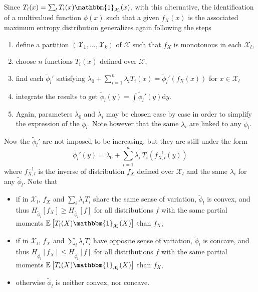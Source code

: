 \documentclass[english,onecolumn]{elsarticle}
\def\d{\mathrm{d}}
\def\X{\mathcal{X}}
\def\un{\mathbbm{1}}
\newcommand\Esp[1]{\mathbb{E}\left[ #1 \right]}
\begin{document}
Since  $T_i(x)  =  \sum_l  T_i(x)  \un_{\X_l}(x)$, with  this  alternative,  the
identification of a multivalued function $\phi(x)$ such that a given $f_X(x)$ is
the  associated maximum  entropy  distribution generalizes  again following  the
steps
%
\begin{enumerate}
\item  define  a partition  $(\X_1,\ldots,\X_k)$  of  $\X$  such that  $f_X$  is
  monotonous in each $\X_l$,
%
\item choose $n$ functions $T_i(x)$ defined over $\X$,
%
\item  find  each $\widetilde{\phi}_l'$  satisfying  $\displaystyle \lambda_0  +
  \sum_{i=1}^n \lambda_i T_i(x) = \widetilde{\phi}_l'(f_X(x))$ for $x \in \X_l$
%
\item integrate  the results to get $\displaystyle  \widetilde{\phi}_l(y) = \int
  \widetilde{\phi}_l'(y) \d y$.
% 
\item Again, parameters  $\lambda_0$ and $\lambda_i$ may be  chosen case by case
  in order to simplify the  expression of the $\widetilde{\phi}_l$. Note however
  that the same $\lambda_i$ are linked to any $\widetilde{\phi}_l$.
\end{enumerate}

Now the  $\widetilde{\phi}_l'$ are  not imposed to  be increasing, but  they are
still under the form
%
\begin{equation}
\widetilde{\phi}_l'(y) = \lambda_0 + \sum_{i=1}^n \lambda_i \, T_i \! \left(
f_{X,l}^{-1}(y) \right)
\label{eq:derivative-phil-nonconcave}
\end{equation}
%
where $f_{X,l}^{-1}$  is the inverse  of distribution $f_X$ defined  over $\X_l$
and the same $\lambda_i$ for any $\widetilde{\phi}_l$. Note that
%
\begin{itemize}
\item if  in $\X_l$, $f_X$  and $\sum_i \lambda_i  T_i$ share the same  sense of
  variation,       $\widetilde{\phi}_l$      is      convex,       and      thus
  $H_{\widetilde{\phi}_l}[f_X]    \ge    H_{\widetilde{\phi_l}}[f]$   for    all
  distributions $f$  with the same partial  moments $\Esp{T_i(X) \un_{\X_l}(X)}$
  than $f_X$,
%
\item if  in $\X_l$,  $f_X$ and  $\sum_i \lambda_i T_i$  have opposite  sense of
  variation,      $\widetilde{\phi}_l$       is      concave,      and      thus
  $H_{\widetilde{\phi}_l}[f_X]    \le    H_{\widetilde{\phi_l}}[f]$   for    all
  distributions $f$  with the same partial  moments $\Esp{T_i(X) \un_{\X_l}(X)}$
  than $f_X$,
%
\item otherwise $\widetilde{\phi}_l$ is neither convex, nor concave.
\end{itemize}
\end{document}
